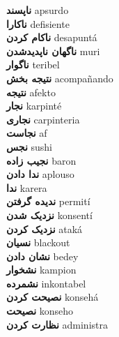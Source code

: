 \textbf{ ناپسند  } apsurdo \\
\textbf{ ناکارا  } defisiente \\
\textbf{ ناکام کردن  } desapuntá \\
\textbf{ ناگهان ناپدیدشدن  } muri \\
\textbf{ ناگوار  } teribel \\
\textbf{ نتیجه بخش  } acompañando \\
\textbf{ نتیجه  } afekto \\
\textbf{ نجار  } karpinté \\
\textbf{ نجاری  } carpinteria \\
\textbf{ نجاست  } af \\
\textbf{ نجس  } sushi \\
\textbf{ نجیب زاده  } baron \\
\textbf{ ندا دادن  } aplouso \\
\textbf{ ندا  } karera \\
\textbf{ ندیده گرفتن  } permití \\
\textbf{ نزدیک شدن  } konsentí \\
\textbf{ نزدیک کردن  } ataká \\
\textbf{ نسیان  } blackout \\
\textbf{ نشان دادن  } bedey \\
\textbf{ نشخوار  } kampion \\
\textbf{ نشمرده  } inkontabel \\
\textbf{ نصیحت کردن  } konsehá \\
\textbf{ نصیحت  } konseho \\
\textbf{ نظارت کردن  } administra \\
